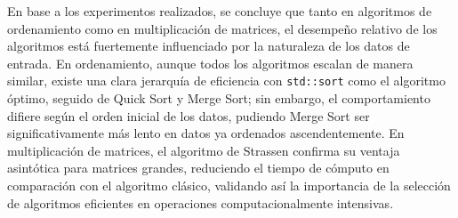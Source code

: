 En base a los experimentos realizados, se concluye que tanto en algoritmos de ordenamiento como en multiplicación de matrices, el desempeño relativo de los algoritmos está fuertemente influenciado por la naturaleza de los datos de entrada. En ordenamiento, aunque todos los algoritmos escalan de manera similar, existe una clara jerarquía de eficiencia con \texttt{std::sort} como el algoritmo óptimo, seguido de Quick Sort y Merge Sort; sin embargo, el comportamiento difiere según el orden inicial de los datos, pudiendo Merge Sort ser significativamente más lento en datos ya ordenados ascendentemente. En multiplicación de matrices, el algoritmo de Strassen confirma su ventaja asintótica para matrices grandes, reduciendo el tiempo de cómputo en comparación con el algoritmo clásico, validando así la importancia de la selección de algoritmos eficientes en operaciones computacionalmente intensivas.
